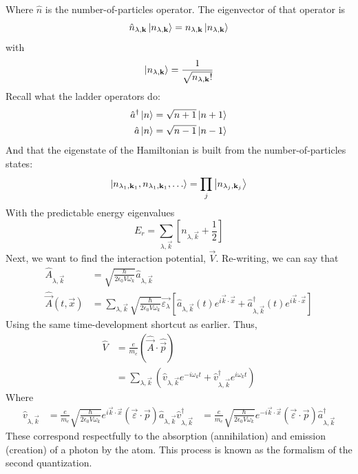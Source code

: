 \documentclass[a4paper]{article}
\begin{document}
Where $\hat{n}$ is the number-of-particles operator. The eigenvector of that
operator is
\[
	\hat{n}_{\lambda,\boldsymbol{\mathbf{k}}}\left\lvert n_{\lambda,\boldsymbol{\mathbf{k}}}\right\rangle =
	n_{\lambda,\boldsymbol{\mathbf{k}}}\left\lvert n_{\lambda,\boldsymbol{\mathbf{k}}}\right\rangle
\]
with
\[
	\left\lvert n_{\lambda,\boldsymbol{\mathbf{k}}}\right\rangle = \frac{1}{\sqrt{n_{\lambda,\boldsymbol{\mathbf{k}}}!}}
\]
Recall what the ladder operators do:
\begin{align*}
	\hat{a}^\dagger\left\lvert n\right\rangle &= \sqrt{n+1}\left\lvert n+1\right\rangle\\
	\hat{a}\left\lvert n\right\rangle &= \sqrt{n-1}\left\lvert n-1\right\rangle\\
\end{align*}
And that the eigenstate of the Hamiltonian is built from the
number-of-particles states:
\[
	\left\lvert n_{\lambda_1,\boldsymbol{\mathbf{k}}_1}, n_{\lambda_1,\boldsymbol{\mathbf{k}}_1},\ldots\right\rangle =
		\prod_{j}\left\lvert n_{\lambda_j,\boldsymbol{\mathbf{k}}_j}\right\rangle
\]
With the predictable energy eigenvalues
\[
	E_r = \sum_{\lambda,\vec{k}}
	\left[
		n_{\lambda,\vec{k}} + \frac{1}{2}
	\right]
\]
Next, we want to find the interaction potential, $\vec{V}$. Re-writing,
we can say that
\begin{align*}
	\hat{A}_{\lambda,\vec{k}} &=
		\sqrt{\frac{\hslash}{2\epsilon_0V\omega_k}}
		\hat{a}_{\lambda,\vec{k}}\\
	\hat{\vec{A}}(t,\vec{x}) &= \sum_{\lambda,\vec{k}}
		\sqrt{\frac{\hslash}{2\epsilon_0V\omega_k}}
		\vec{\varepsilon_\lambda}
		\left[
			\hat{a}_{\lambda,\vec{k}}(t)e^{i\vec{k}\cdot\vec{x}} +
			\hat{a}^\dagger_{\lambda,\vec{k}}(t)
				e^{i\vec{k}\cdot\vec{x}}
		\right]
\end{align*}
Using the same time-development shortcut as earlier. Thus,
\begin{align*}
	\hat{V} &= \frac{e}{m_e}(\hat{\vec{A}}\cdot\hat{\vec{p}})\\
		&= \sum_{\lambda,\vec{k}}
		\left(
			\hat{v}_{\lambda,\vec{k}} e^{-i\omega_k t} +
			\hat{v}^\dagger_{\lambda,\vec{k}} e^{i\omega_k t}
		\right)
\end{align*}
Where
\begin{align*}
	\hat{v}_{\lambda,\vec{k}} &= \frac{e}{m_e}
		\sqrt{\frac{\hslash}{2\epsilon_0V\omega_k}}
		e^{i\vec{k}\cdot\vec{x}}(\vec{\varepsilon}\cdot\vec{p})
		\hat{a}_{\lambda,\vec{k}}
	\hat{v}^\dagger_{\lambda,\vec{k}} &= \frac{e}{m_e}
		\sqrt{\frac{\hslash}{2\epsilon_0V\omega_k}}
		e^{-i\vec{k}\cdot\vec{x}}(\vec{\varepsilon}\cdot\vec{p})
		\hat{a}^\dagger_{\lambda,\vec{k}}
\end{align*}
These correspond respectfully to the absorption (annihilation) and emission
(creation) of a photon by the atom. This process is known as the formalism of
the second quantization.
\end{document}
